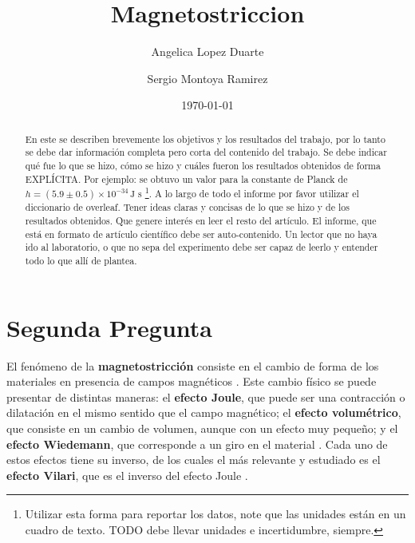 \documentclass[a4paper, amsfonts, amssymb, amsmath, reprint, showkeys, nofootinbib, twoside]{revtex4-1}
\begin{document}
\title{Magnetostriccion}


\author{Angelica Lopez Duarte}

\author{Sergio Montoya Ramirez}
  


\date{\today} %

\begin{abstract}

En este se describen brevemente los objetivos y los resultados del trabajo, por lo tanto se debe dar información completa pero corta del contenido del trabajo. Se debe indicar qué fue lo que se hizo, cómo se hizo y cuáles fueron los resultados obtenidos de forma EXPLÍCITA. Por ejemplo: se obtuvo un valor para la constante de Planck de $h=(5.9\pm 0.5)\times 10^{-34}\,\text{J s}$ \footnote{Utilizar esta forma para reportar los datos, note que las unidades están en un cuadro de texto. TODO debe llevar unidades e incertidumbre, siempre.}. A lo largo de todo el informe por favor utilizar el diccionario de overleaf. Tener ideas claras y concisas de lo que se hizo y de los resultados obtenidos. Que genere interés en leer el resto del artículo. El informe, que está en formato de artículo científico debe ser auto-contenido. Un lector que no haya ido al laboratorio, o que no sepa del experimento debe ser capaz de leerlo y entender todo lo que allí de plantea.

\end{abstract}

\maketitle

\section{Segunda Pregunta}

El fen\'{o}meno de la \textbf{magnetostricci\'{o}n} consiste en el cambio de forma de los materiales en presencia de campos magn\'{e}ticos \cite{Piercy_1997}. Este cambio f\'{i}sico se puede presentar de distintas maneras: el \textbf{efecto Joule}, que puede ser una contracci\'{o}n o dilataci\'{o}n en el mismo sentido que el campo magn\'{e}tico; el \textbf{efecto volum\'{e}trico}, que consiste en un cambio de volumen, aunque con un efecto muy peque\~{n}o; y el \textbf{efecto Wiedemann}, que corresponde a un giro en el material \cite{Ekreem_2007}. Cada uno de estos efectos tiene su inverso, de los cuales el m\'{a}s relevante y estudiado es el \textbf{efecto Vilari}, que es el inverso del efecto Joule \cite{Lee_2002}.
\end{document}

